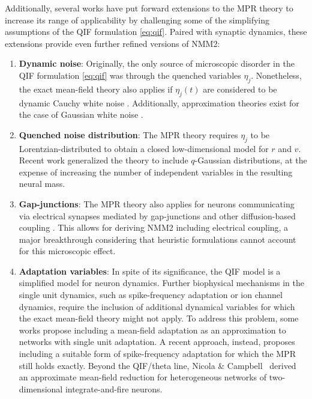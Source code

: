 \documentclass[12pt]{article}
\numberwithin{equation}{section}
\newcommand{\rev}[1]{\begingroup\color{navyblue}#1\endgroup}
\begin{document}
Additionally,
several works have put forward extensions to the MPR theory to increase its range
of applicability by challenging some of the simplifying assumptions of the QIF formulation \eqref{eq:qif}.
Paired with synaptic dynamics, these extensions provide even further refined versions of NMM2:

\begin{enumerate}
    \item \textbf{Dynamic noise}: Originally, the only source of microscopic disorder in the QIF formulation \eqref{eq:qif} was through the quenched variables $\eta_j$.
    Nonetheless, the exact mean-field theory also applies if $\eta_j(t)$ are considered to be
    dynamic Cauchy white noise \cite{clusella2024}. Additionally, approximation theories exist for the case of Gaussian white noise \cite{Goldobin2021,Goldobin2021_2}.
    \item \textbf{Quenched noise distribution}: The MPR theory requires $\eta_j$ to be Lorentzian-distributed to obtain a closed low-dimensional model for $r$ and $v$.
    Recent work generalized the theory to include $q$-Gaussian distributions, at the expense of
    increasing the number of independent variables in the resulting neural mass\cite{PP22,PP24}. 
    \item \textbf{Gap-junctions}: The MPR theory also applies for neurons communicating via electrical synapses mediated by gap-junctions and other diffusion-based coupling \cite{Pietras2019,Montbrio:2020aa}. This allows for deriving NMM2 including electrical coupling, a major breakthrough considering that heuristic formulations cannot account for this microscopic effect. 
    \item \textbf{Adaptation variables}: In spite of its significance, the QIF model is a simplified model for neuron dynamics. Further biophysical mechanisms in the single unit dynamics, such as spike-frequency adaptation or ion channel dynamics, require the inclusion of additional dynamical variables for which the exact mean-field theory might not apply.
    To address this problem, some works propose including a mean-field adaptation as an approximation to networks with single unit adaptation\cite{chenExactMeanfieldModels2022,ferraraPopulationSpikingBursting2023}. 
    A recent approach, instead, proposes including a suitable form of spike-frequency adaptation for which the MPR still holds exactly\cite{Pietras2025}. \rev{Beyond the QIF/theta line, Nicola \& Campbell~\cite{NicolaCampbell2013} derived an approximate mean-field reduction for heterogeneous networks of two-dimensional integrate-and-fire neurons.}

\end{enumerate}
\end{document}
